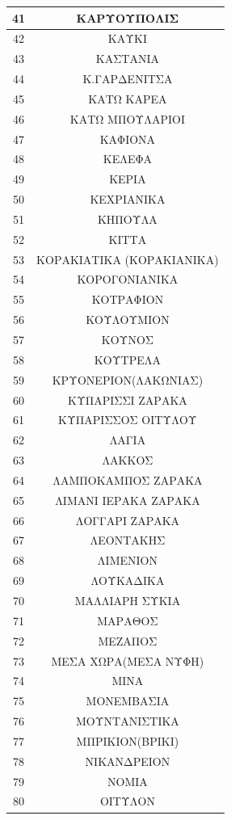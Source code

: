 \documentclass[12pt]{article}
\begin{document}
	\begin{table}[H]
		\centering
		\begin{tabular}{|c|c|}
			\hline
			\textbf{41} & \textbf{ΚΑΡΥΟΥΠΟΛΙΣ} \\ \hline
			42 & ΚΑΥΚΙ \\ \hline
			43 & ΚΑΣΤΑΝΙΑ \\ \hline
			44 & Κ.ΓΑΡΔΕΝΙΤΣΑ \\ \hline
			45 & ΚΑΤΩ ΚΑΡΕΑ \\ \hline
			46 & ΚΑΤΩ ΜΠΟΥΛΑΡΙΟΙ \\ \hline
			47 & ΚΑΦΙΟΝΑ \\ \hline
			48 & ΚΕΛΕΦΑ \\ \hline
			49 & ΚΕΡΙΑ \\ \hline
			50 & ΚΕΧΡΙΑΝΙΚΑ \\ \hline
			51 & ΚΗΠΟΥΛΑ \\ \hline
			52 & ΚΙΤΤΑ \\ \hline
			53 & ΚΟΡΑΚΙΑΤΙΚΑ (ΚΟΡΑΚΙΑΝΙΚΑ) \\ \hline
			54 & ΚΟΡΟΓΟΝΙΑΝΙΚΑ \\ \hline
			55 & ΚΟΤΡΑΦΙΟΝ \\ \hline
			56 & ΚΟΥΛΟΥΜΙΟΝ \\ \hline
			57 & ΚΟΥΝΟΣ \\ \hline
			58 & ΚΟΥΤΡΕΛΑ \\ \hline
			59 & ΚΡΥΟΝΕΡΙΟΝ(ΛΑΚΩΝΙΑΣ) \\ \hline
			60 & ΚΥΠΑΡΙΣΣΙ ΖΑΡΑΚΑ \\ \hline
			61 & ΚΥΠΑΡΙΣΣΟΣ ΟΙΤΥΛΟΥ \\ \hline
			62 & ΛΑΓΙΑ \\ \hline
			63 & ΛΑΚΚΟΣ \\ \hline
			64 & ΛΑΜΠΟΚΑΜΠΟΣ ΖΑΡΑΚΑ \\ \hline
			65 & ΛΙΜΑΝΙ ΙΕΡΑΚΑ ΖΑΡΑΚΑ \\ \hline
			66 & ΛΟΓΓΑΡΙ ΖΑΡΑΚΑ \\ \hline
			67 & ΛΕΟΝΤΑΚΗΣ \\ \hline
			68 & ΛΙΜΕΝΙΟΝ \\ \hline
			69 & ΛΟΥΚΑΔΙΚΑ \\ \hline
			70 & ΜΑΛΛΙΑΡΗ ΣΥΚΙΑ \\ \hline
			71 & ΜΑΡΑΘΟΣ \\ \hline
			72 & ΜΕΖΑΠΟΣ \\ \hline
			73 & ΜΕΣΑ ΧΩΡΑ(ΜΕΣΑ ΝΥΦΗ) \\ \hline
			74 & ΜΙΝΑ \\ \hline
			75 & ΜΟΝΕΜΒΑΣΙΑ \\ \hline
			76 & ΜΟΥΝΤΑΝΙΣΤΙΚΑ \\ \hline
			77 & ΜΠΡΙΚΙΟΝ(ΒΡΙΚΙ) \\ \hline
			78 & ΝΙΚΑΝΔΡΕΙΟΝ \\ \hline
			79 & ΝΟΜΙΑ \\ \hline
			80 & ΟΙΤΥΛΟΝ \\ \hline
		\end{tabular}
	\end{table}
\end{document}
